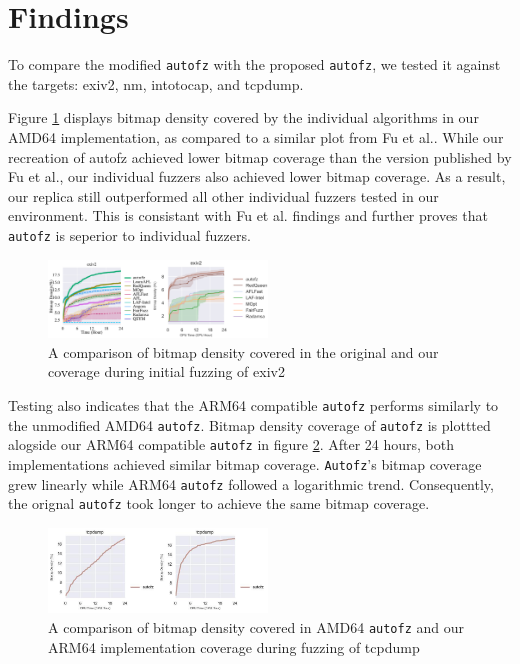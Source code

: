 \section{Findings}

To compare the modified \texttt{autofz} with the proposed \texttt{autofz}, we tested it against the 
targets: exiv2, nm, intotocap, and tcpdump. 

Figure \ref{fig:exiv2_compare_orig_arm64} displays bitmap density covered by the individual algorithms in our AMD64 implementation, 
as compared to a similar plot from Fu et al.\cite{fu_autofz_2023}. While our recreation of autofz achieved lower bitmap coverage than 
the version published by Fu et al., our individual fuzzers also achieved lower bitmap coverage. As a result, our replica still 
outperformed all other individual fuzzers tested in our environment. This is consistant
with Fu et al. findings and further proves that \texttt{autofz} is seperior to individual fuzzers.

\begin{figure}
    \includegraphics[width=0.52\textwidth]{figs/exiv2_compare_orig_arm64.png}
    \centering
    \caption{A comparison of bitmap density covered in the original\cite{fu_autofz_2023} and our 
    coverage during initial fuzzing of exiv2}
    \label{fig:exiv2_compare_orig_arm64}
\end{figure}

Testing also indicates that the ARM64 compatible \texttt{autofz} performs similarly to the unmodified AMD64 \texttt{autofz}. 
Bitmap density coverage of \texttt{autofz} is plottted alogside our ARM64 compatible \texttt{autofz} in figure 
\ref{fig:tcpdump_compare_orig_arm64}. After 24 hours, both implementations achieved similar bitmap coverage.
\texttt{Autofz}'s bitmap coverage grew linearly while ARM64 \texttt{autofz} followed a logarithmic trend. Consequently, 
the orignal \texttt{autofz} took longer to achieve the same bitmap coverage. 

\begin{figure}
    \includegraphics[width=0.52\textwidth]{figs/tcpdump_compare_orig_arm64.png}
    \centering
    \caption{A comparison of bitmap density covered in AMD64 \texttt{autofz} and our ARM64 implementation
    coverage during fuzzing of tcpdump}
    \label{fig:tcpdump_compare_orig_arm64}
\end{figure}

